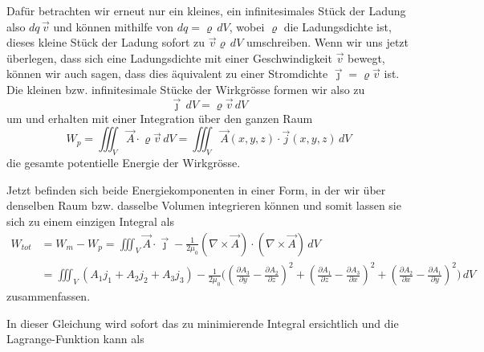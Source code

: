 Dafür betrachten wir erneut nur ein kleines, ein infinitesimales Stück der Ladung also $dq\,\vec{v}$ und können mithilfe von $dq = \varrho\,dV$, wobei $\varrho$ die Ladungsdichte ist, dieses kleine Stück der Ladung sofort zu $\vec{v}\varrho\,dV$ umschreiben.
Wenn wir uns jetzt überlegen, dass sich eine Ladungsdichte mit einer Geschwindigkeit $\vec{v}$ bewegt, können wir auch sagen, dass dies äquivalent zu einer Stromdichte $\vec{\jmath}=\varrho\vec{v}$ ist. 
Die kleinen bzw. infinitesimale Stücke der Wirkgrösse formen wir also zu \[\vec{\jmath}\,dV = \varrho\vec{v}\,dV\]
um und erhalten mit einer Integration über den ganzen Raum
\begin{equation}
	W_p
	= 
	\iiint_V \vec{A}\cdot\varrho\vec{v}\,dV
	=
	\iiint_V \vec{A}(x,y,z)\cdot\vec{j}(x,y,z)\,dV
\end{equation}
die gesamte potentielle Energie der Wirkgrösse.

Jetzt befinden sich beide Energiekomponenten in einer Form, in der wir über denselben Raum bzw. dasselbe Volumen integrieren können und somit lassen sie sich zu einem einzigen Integral als 
\begin{align*}
W_{tot} 
&=
W_m - W_p
=
\iiint_V \vec{A}\cdot\vec{\jmath}
- \frac{1}{2\mu_0}\left(\nabla\times\vec{A}\right)\cdot\left(\nabla\times\vec{A}\right)\, dV \\
&=
\iiint_V \left( A_1j_1 + A_2j_2 + A_3j_3\right) - 
 \frac{1}{2\mu_0}\biggl( 
 	\left( \frac{\partial A_3}{\partial y} -\frac{\partial A_2}{\partial z}\right)^2 
 + \left( \frac{\partial A_1}{\partial z} -\frac{\partial A_3}{\partial x}\right)^2
 + \left(\frac{\partial A_2}{\partial x} -\frac{\partial A_1}{\partial y} \right)^2   
 \biggr) \,dV
\end{align*}
zusammenfassen.

In dieser Gleichung wird sofort das zu minimierende Integral ersichtlich und die Lagrange-Funktion kann als 

	
